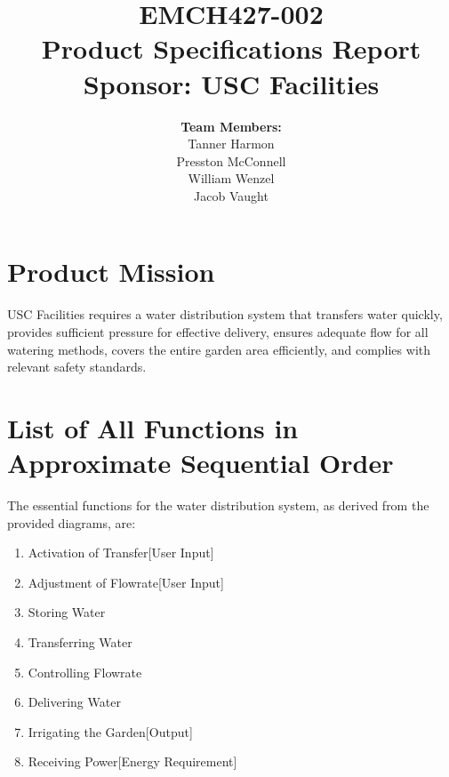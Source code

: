 \documentclass[12pt]{article}
\begin{document}
\title{
    \vspace{2in}
    \textbf{EMCH427-002} \\[1ex]
    \textbf{Product Specifications Report} \\[1ex]
    \textbf{Sponsor: USC Facilities} \\[1ex]
    \vspace{2in}
}

\author{
    \textbf{Team Members:} \\[2ex]
    Tanner Harmon  \\[1ex]
    Presston McConnell  \\[1ex]
    William Wenzel  \\[1ex]
    Jacob Vaught   \\[2ex]
}

\date{}

\maketitle
\thispagestyle{fancy}

\section*{Product Mission}
\noindent USC Facilities requires a water distribution system that transfers water quickly, provides sufficient pressure for effective delivery, ensures adequate flow for all watering methods, covers the entire garden area efficiently, and complies with relevant safety standards.

\section*{List of All Functions in Approximate Sequential Order}
The essential functions for the water distribution system, as derived from the provided diagrams, are:

\begin{enumerate}
    \item Activation of Transfer[User Input]
    \item Adjustment of Flowrate[User Input]
    \item Storing Water
    \item Transferring Water
    \item Controlling Flowrate
    \item Delivering Water
    \item Irrigating the Garden[Output]
    \item Receiving Power[Energy Requirement]
\end{enumerate}
\end{document}
